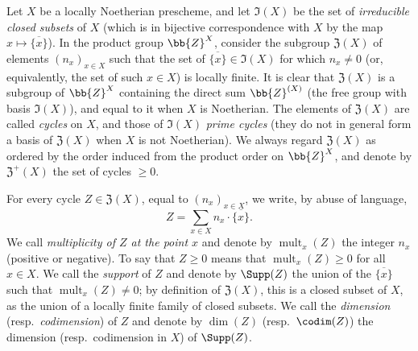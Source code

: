 \begin{env}[21.6.1]
\label{IV.21.6.1}
Let $X$ be a locally Noetherian prescheme, and let $\mathfrak{I}(X)$ be the set of \emph{irreducible closed subsets} of $X$ (which is in bijective correspondence with $X$ by the map $x\mapsto\overline{\{x\}}$).
In the product group $\bb{Z}^X$, consider the subgroup $\mathfrak{Z}(X)$ of elements $(n_x)_{x\in X}$ such that the set of $\overline{\{x\}}\in\mathfrak{I}(X)$ for which $n_x\neq0$ (or, equivalently, the set of such $x\in X$) is locally finite.
It is clear that $\mathfrak{Z}(X)$ is a subgroup of $\bb{Z}^X$ containing the direct sum $\bb{Z}^{(X)}$ (the free group with basis $\mathfrak{I}(X)$), and equal to it when $X$ is Noetherian.
The elements of $\mathfrak{Z}(X)$ are called \emph{cycles} on $X$, and those of $\mathfrak{I}(X)$ \emph{prime cycles} (they do not in general form a basis of $\mathfrak{Z}(X)$ when $X$ is not Noetherian).
We always regard $\mathfrak{Z}(X)$ as ordered by the order induced from the product order on $\bb{Z}^X$, and denote by $\mathfrak{Z}^+(X)$ the set of cycles $\geq0$.


For every cycle $Z\in\mathfrak{Z}(X)$, equal to $(n_x)_{x\in X}$, we write, by abuse of language,
\[
  Z=\sum_{x\in X}n_x\cdot\overline{\{x\}}.
\]
We call \emph{multiplicity of $Z$ at the point $x$} and denote by $\operatorname{mult}_x(Z)$ the integer $n_x$ (positive or negative).
To say that $Z\geq 0$ means that $\operatorname{mult}_x(Z)\geq 0$ for all $x\in X$.
We call the \emph{support} of $Z$ and denote by $\Supp(Z)$ the union of the $\overline{\{x\}}$ such that $\operatorname{mult}_x(Z)\neq 0$;
by definition of $\mathfrak{Z}(X)$, this is a closed subset of $X$, as the union of a locally finite family of closed subsets.
We call the \emph{dimension} (resp.\ \emph{codimension}) of $Z$ and denote by $\dim(Z)$ (resp.\ $\codim(Z)$) the dimension (resp.\ codimension in $X$) of $\Supp(Z)$.
\end{env}

